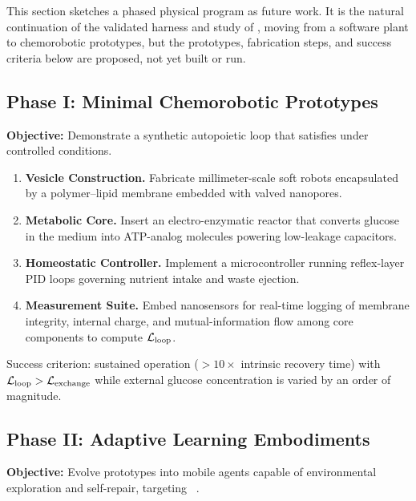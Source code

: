 \documentclass[11pt]{article}
\begin{document}
This section sketches a phased physical program as future work. It is the natural continuation of the validated harness and study of , moving from a software plant to chemorobotic prototypes, but the prototypes, fabrication steps, and success criteria below are proposed, not yet built or run.

\subsection{Phase I: Minimal Chemorobotic Prototypes}
\label{sec:phase1}

\textbf{Objective:} Demonstrate a synthetic autopoietic loop that satisfies \NC under controlled conditions.

\begin{enumerate}
\item \textbf{Vesicle Construction.} Fabricate millimeter-scale soft robots encapsulated by a polymer--lipid membrane embedded with valved nanopores.
\item \textbf{Metabolic Core.} Insert an electro-enzymatic reactor that converts glucose in the medium into ATP-analog molecules powering low-leakage capacitors.
\item \textbf{Homeostatic Controller.} Implement a microcontroller running reflex-layer PID loops governing nutrient intake and waste ejection.
\item \textbf{Measurement Suite.} Embed nanosensors for real-time logging of membrane integrity, internal charge, and mutual-information flow among core components to compute $\mathcal{L}_{\text{loop}}$.
\end{enumerate}

Success criterion: sustained operation ($>10\times$ intrinsic recovery time) with $\mathcal{L}_{\text{loop}} > \mathcal{L}_{\text{exchange}}$ while external glucose concentration is varied by an order of magnitude.

\subsection{Phase II: Adaptive Learning Embodiments}
\label{sec:phase2}

\textbf{Objective:} Evolve prototypes into mobile agents capable of environmental exploration and self-repair, targeting \SC~\cite{pfeifer2007body,cully2015robots}.
\end{document}
